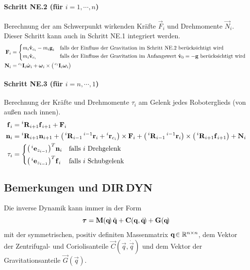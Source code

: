 			\paragraph{Schritt NE.2 (für \( i = 1, \cdots, n \))}
				Berechnung der am Schwerpunkt wirkenden Kräfte \( \vec{F}_i \) und Drehmomente \( \vec{N}_i \). Dieser Schritt kann auch in Schritt NE.1 integriert werden.
				\begin{align*}
					\vec{F}_i &=
						\begin{cases*}
							m_i \vec{\dot{v}}_{c_i} - m_i \vec{g}_i & falls der Einfluss der Gravitation im Schritt NE.2 berücksichtigt wird \\
							m_i \vec{\dot{v}}_{c_i}                 & falls der Einfluss der Gravitation im Anfangswert \( \vec{\dot{v}}_0 = -\vec{g} \) berücksichtigt wird
						\end{cases*} \\
					\vec{N}_i &= \inreferenceto{c_i}{\mat{I}}_i \dot{\vec{\omega}}_i + \vec{\omega}_i \times \big( \inreferenceto{c_i}{\mat{I}}_i \vec{\omega}_i \big)
				\end{align*}
			
			\paragraph{Schritt NE.3 (für \( i = n, \cdots, 1 \))}
				Berechnung der Kräfte und Drehmomente \( \tau_i \) am Gelenk jedes Roboterglieds (von außen nach innen).
				\begin{align*}
					\vec{f}_i &= \inreferenceto{i}{\mat{R}}_{i + 1} \vec{f}_{i + 1} + \vec{F}_i \\
					\vec{n}_i &= \inreferenceto{i}{\mat{R}}_{i + 1} \vec{n}_{i + 1} + \big( \inreferenceto{i}{\mat{R}}_{i - 1} \inreferenceto{i - 1}{\vec{r}}_i + \inreferenceto{i}{\vec{r}}_{c_i} \big) \times \vec{F}_i + \big( \inreferenceto{i}{\mat{R}}_{i - 1} \inreferenceto{i - 1}{\vec{r}}_i \big) \times \big( \inreferenceto{i}{\mat{R}}_{i + 1} \vec{f}_{i + 1} \big) + \vec{N}_i \\
					\tau_i &=
						\begin{cases*}
							\big( \inreferenceto{i}{\vec{e}}_{z_{i - 1}} \big)^T \vec{n}_i & falls \(i\) Drehgelenk \\
							\big( \inreferenceto{i}{\vec{e}}_{z_{i - 1}} \big)^T \vec{f}_i & falls \(i\) Schubgelenk
						\end{cases*}
				\end{align*}
		
		\subsection{Bemerkungen und DIR\,DYN}
			Die inverse Dynamik \INVDYN kann immer in der Form
			\begin{equation*}
				\boldsymbol{\mathrm{\tau}} = \boldsymbol{\mathrm{M}}(\boldsymbol{\mathrm{q}}\!)\, \ddot{\boldsymbol{\mathrm{q}}} + \boldsymbol{\mathrm{C}}(\boldsymbol{\mathrm{q}}, \dot{\boldsymbol{\mathrm{q}}}\!) + \boldsymbol{\mathrm{G}}(\boldsymbol{\mathrm{q}}\!)
			\end{equation*}
			mit der symmetrischen, positiv definiten Massenmatrix \( \boldsymbol{\mathrm{\boldsymbol{\mathrm{q}}\!}} \in \mathbb{R}^{n \times n} \), dem Vektor der Zentrifugal- und Coriolisanteile \( \vec{C}(\vec{q}, \dot{\vec{q}}\!) \) und dem Vektor der Gravitationsanteile \( \vec{G}(\vec{q}\!) \).
			
